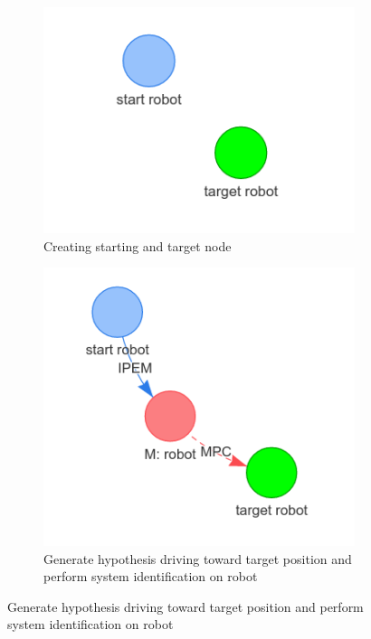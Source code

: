 \begin{figure}[H]
     \centering
     \begin{subfigure}[b]{0.49\textwidth}
         \centering
         \includegraphics[width=\textwidth]{figures/surrounded/1.png}
         \caption{Creating starting and target node}
     \end{subfigure}
     \hfill
     \begin{subfigure}[b]{0.49\textwidth}
         \centering
         \includegraphics[width=\textwidth]{figures/surrounded/2.png}
         \caption{Generate hypothesis driving toward target position and perform system identification on robot}
     \end{subfigure}
     

\end{figure}
